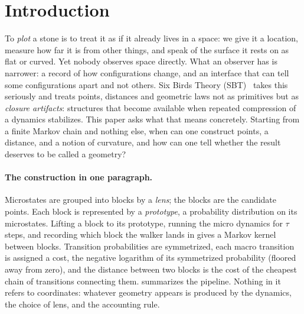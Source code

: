 \section{Introduction}
\label{sec:introduction}

To \emph{plot} a stone is to treat it as if it already lives in a space: we give it a location, measure how far it is from other things, and speak of the surface it rests on as flat or curved.
Yet nobody observes space directly.
What an observer has is narrower: a record of how configurations change, and an interface that can tell some configurations apart and not others.
Six Birds Theory (SBT)~\cite{SixBirdsTheory} takes this seriously and treats points, distances and geometric laws not as primitives but as \emph{closure artifacts}: structures that become available when repeated compression of a dynamics stabilizes.
This paper asks what that means concretely.
Starting from a finite Markov chain and nothing else, when can one construct points, a distance, and a notion of curvature, and how can one tell whether the result deserves to be called a geometry?

\paragraph{The construction in one paragraph.}
Microstates are grouped into blocks by a \emph{lens}; the blocks are the candidate points.
Each block is represented by a \emph{prototype}, a probability distribution on its microstates.
Lifting a block to its prototype, running the micro dynamics for $\tau$ steps, and recording which block the walker lands in gives a Markov kernel between blocks.
Transition probabilities are symmetrized, each macro transition is assigned a cost, the negative logarithm of its symmetrized probability (floored away from zero), and the distance between two blocks is the cost of the cheapest chain of transitions connecting them.
 summarizes the pipeline.
Nothing in it refers to coordinates: whatever geometry appears is produced by the dynamics, the choice of lens, and the accounting rule.

